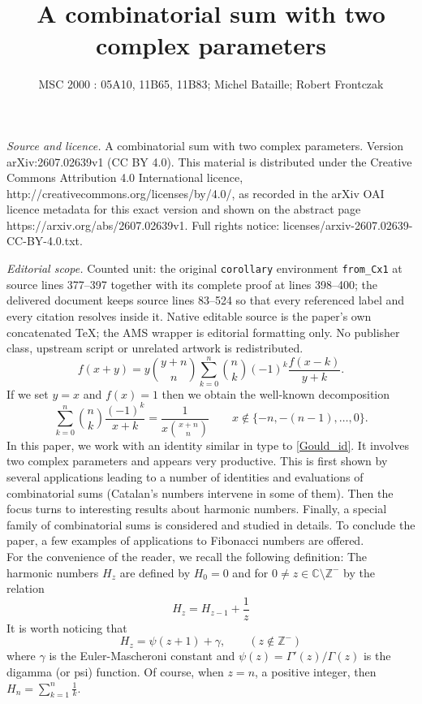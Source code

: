 \documentclass[10pt,a4paper]{amsart}
\numberwithin{equation}{section}
\begin{document}
\title[A combinatorial sum with two complex parameters]{A combinatorial sum with two complex parameters}
\author{MSC 2000 : 05A10, 11B65, 11B83; Michel Bataille; Robert Frontczak}
\date{}
\maketitle
\noindent\emph{Source and licence.} A combinatorial sum with two complex parameters. Version arXiv:2607.02639v1 (CC BY 4.0). This material is distributed under the Creative Commons Attribution 4.0 International licence, http://creativecommons.org/licenses/by/4.0/, as recorded in the arXiv OAI licence metadata for this exact version and shown on the abstract page https://arxiv.org/abs/2607.02639v1. Full rights notice: licenses/arxiv-2607.02639-CC-BY-4.0.txt.\par\smallskip
\noindent\textit{Editorial scope.} Counted unit: the original \texttt{corollary} environment \texttt{from\_Cx1} at source lines 377--397 together with its complete proof at lines 398--400; the delivered document keeps source lines 83--524 so that every referenced label and every citation resolves inside it. Native editable source is the paper's own concatenated TeX; the AMS wrapper is editorial formatting only. No publisher class, upstream script or unrelated artwork is redistributed.
\begin{equation}\label{Gould_id}
f(x+y) = y \binom{y+n}{n} \sum_{k=0}^n \binom{n}{k} (-1)^k \frac{f(x-k)}{y+k}.
\end{equation}
If we set $y=x$ and $f(x)=1$ then
we obtain the well-known decomposition
\begin{equation}\label{partial}
\sum_{k=0}^n \binom{n}{k} \frac{(-1)^k}{x+k} = \frac{1}{x\binom{x+n}{n}} \qquad x\notin \{-n,-(n-1),\ldots,0\}.
\end{equation}
In this paper, we work with an identity similar in type to \eqref{Gould_id}. It involves two complex parameters and appears very productive. This is first shown by several applications leading to a number of identities and evaluations of combinatorial sums (Catalan's numbers intervene in some of them). Then the focus turns to interesting results about harmonic numbers. Finally, a special family of combinatorial sums is considered and studied in details. To conclude the paper, a few examples of applications to Fibonacci numbers are offered.\\[0.3cm]
For the convenience of the reader, we recall the following definition: 
The harmonic numbers $H_z$ are defined by $H_0=0$ and for $0\ne z\in\mathbb C\setminus\mathbb Z^{-}$ by the relation
\begin{equation*}
H_z = H_{z - 1} + \frac{1}{z}
\end{equation*}
It is worth noticing that
\begin{equation}\label{Har_psi}
H_z = \psi(z + 1) + \gamma,\qquad (z\notin \mathbb{Z}^-)
\end{equation}
where $\gamma$ is the Euler-Mascheroni constant and $\psi(z)=\Gamma'(z)/\Gamma(z)$ is the digamma (or psi) function. 
Of course, when $z=n$, a positive integer, then $H_n=\sum_{k=1}^n \frac{1}{k}$.
\end{document}
